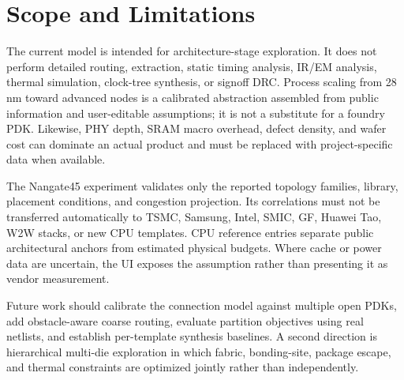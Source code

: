 \section{Scope and Limitations}
The current model is intended for architecture-stage exploration. It does not perform detailed routing, extraction, static timing analysis, IR/EM analysis, thermal simulation, clock-tree synthesis, or signoff DRC. Process scaling from 28 nm toward advanced nodes is a calibrated abstraction assembled from public information and user-editable assumptions; it is not a substitute for a foundry PDK. Likewise, PHY depth, SRAM macro overhead, defect density, and wafer cost can dominate an actual product and must be replaced with project-specific data when available.

The Nangate45 experiment validates only the reported topology families, library, placement conditions, and congestion projection. Its correlations must not be transferred automatically to TSMC, Samsung, Intel, SMIC, GF, Huawei Tao, W2W stacks, or new CPU templates. CPU reference entries separate public architectural anchors from estimated physical budgets. Where cache or power data are uncertain, the UI exposes the assumption rather than presenting it as vendor measurement.

Future work should calibrate the connection model against multiple open PDKs, add obstacle-aware coarse routing, evaluate partition objectives using real netlists, and establish per-template synthesis baselines. A second direction is hierarchical multi-die exploration in which fabric, bonding-site, package escape, and thermal constraints are optimized jointly rather than independently.
